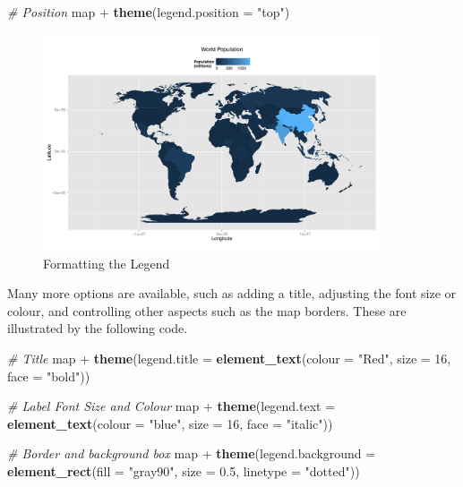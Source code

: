 \documentclass[]{article}
\newenvironment{Shaded}{}{}
\newcommand{\KeywordTok}[1]{\textcolor[rgb]{0.00,0.44,0.13}{\textbf{{#1}}}}
\newcommand{\DataTypeTok}[1]{\textcolor[rgb]{0.56,0.13,0.00}{{#1}}}
\newcommand{\DecValTok}[1]{\textcolor[rgb]{0.25,0.63,0.44}{{#1}}}
\newcommand{\FloatTok}[1]{\textcolor[rgb]{0.25,0.63,0.44}{{#1}}}
\newcommand{\StringTok}[1]{\textcolor[rgb]{0.25,0.44,0.63}{{#1}}}
\newcommand{\CommentTok}[1]{\textcolor[rgb]{0.38,0.63,0.69}{\textit{{#1}}}}
\newcommand{\NormalTok}[1]{{#1}}
\let\Oldincludegraphics\includegraphics
\renewcommand{\includegraphics}[1]{\Oldincludegraphics[width=10cm]{#1}}
\begin{document}
\begin{Shaded}
\begin{Highlighting}[]
\CommentTok{# Position}
\NormalTok{map + }\KeywordTok{theme}\NormalTok{(}\DataTypeTok{legend.position =} \StringTok{"top"}\NormalTok{)}
\end{Highlighting}
\end{Shaded}
\begin{figure}[htbp]
\centering
\includegraphics{figs/Formatting_the_Legend}
\caption{Formatting the Legend}
\end{figure}

Many more options are available, such as adding a title, adjusting the font size or colour, and controlling other aspects such as the map borders. These are illustrated by the following code.

\begin{Shaded}
\begin{Highlighting}[]
\CommentTok{# Title}
\NormalTok{map + }\KeywordTok{theme}\NormalTok{(}\DataTypeTok{legend.title =} \KeywordTok{element_text}\NormalTok{(}\DataTypeTok{colour =} \StringTok{"Red"}\NormalTok{, }\DataTypeTok{size =} \DecValTok{16}\NormalTok{, }\DataTypeTok{face =} \StringTok{"bold"}\NormalTok{))}

\CommentTok{# Label Font Size and Colour}
\NormalTok{map + }\KeywordTok{theme}\NormalTok{(}\DataTypeTok{legend.text =} \KeywordTok{element_text}\NormalTok{(}\DataTypeTok{colour =} \StringTok{"blue"}\NormalTok{, }\DataTypeTok{size =} \DecValTok{16}\NormalTok{, }\DataTypeTok{face =} \StringTok{"italic"}\NormalTok{))}

\CommentTok{# Border and background box}
\NormalTok{map + }\KeywordTok{theme}\NormalTok{(}\DataTypeTok{legend.background =} \KeywordTok{element_rect}\NormalTok{(}\DataTypeTok{fill =} \StringTok{"gray90"}\NormalTok{, }\DataTypeTok{size =} \FloatTok{0.5}\NormalTok{, }\DataTypeTok{linetype =} \StringTok{"dotted"}\NormalTok{))}
\end{Highlighting}
\end{Shaded}
\end{document}
